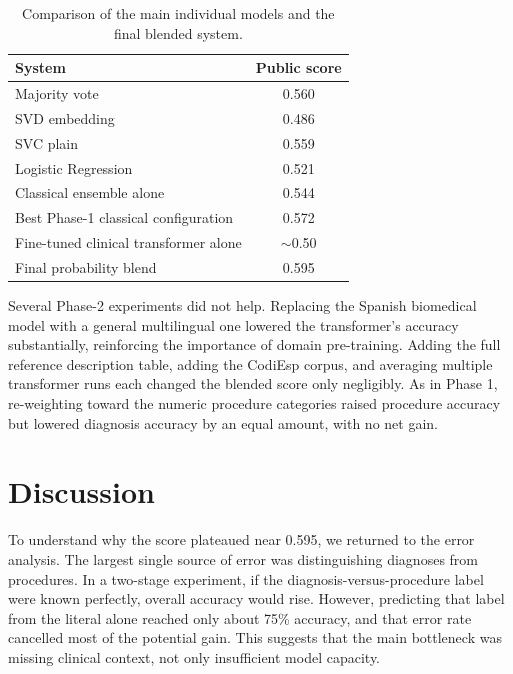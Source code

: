 \documentclass[9pt,a4paper,twoside]{utils/tau-class/tau}
\begin{document}
\begin{table}[H]
    \centering
    \caption{Comparison of the main individual models and the final blended system.}
    \label{tab:model-comparison}
    \footnotesize
    \begin{tabular}{p{}c}
        \toprule
        \textbf{System} & \textbf{Public score} \\
        \midrule
        Majority vote & 0.560 \\
        SVD embedding & 0.486 \\
        SVC plain & 0.559 \\
        Logistic Regression & 0.521 \\
        Classical ensemble alone & 0.544 \\
        Best Phase-1 classical configuration & 0.572 \\
        Fine-tuned clinical transformer alone & $\sim$0.50 \\
        Final probability blend & 0.595 \\
        \bottomrule
    \end{tabular}
\end{table}

Several Phase-2 experiments did not help. Replacing the Spanish biomedical model with a general multilingual one lowered the transformer's accuracy substantially, reinforcing the importance of domain pre-training. Adding the full reference description table, adding the CodiEsp corpus, and averaging multiple transformer runs each changed the blended score only negligibly. As in Phase 1, re-weighting toward the numeric procedure categories raised procedure accuracy but lowered diagnosis accuracy by an equal amount, with no net gain.

\section{Discussion}

To understand why the score plateaued near 0.595, we returned to the error analysis. The largest single source of error was distinguishing diagnoses from procedures. In a two-stage experiment, if the diagnosis-versus-procedure label were known perfectly, overall accuracy would rise. However, predicting that label from the literal alone reached only about 75\% accuracy, and that error rate cancelled most of the potential gain. This suggests that the main bottleneck was missing clinical context, not only insufficient model capacity.
\end{document}
